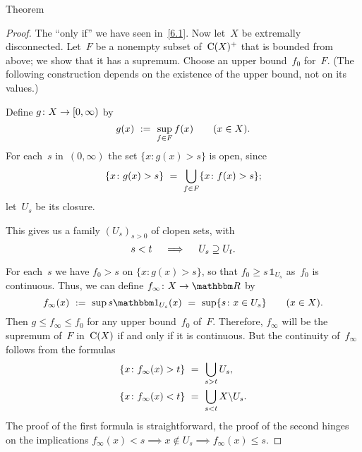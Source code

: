 \documentclass[main.tex]{subfiles}
\begin{document}
%
%
\begin{psec}{6.5}{Theorem}\end{psec}
\begin{proof}
The ``only if'' we have seen in~\ref{6.1}.
Now let~$X$ be extremally disconnected.
Let~$F$ be a nonempty subset of~$\mathrm{C}(X)^+$
that is bounded from above;
we show that it has a supremum.
Choose an upper bound~$f_0$ for~$F$.
(The following construction depends on the existence
of the upper bound, not on its values.)

Define $g\colon X\rightarrow [0,\infty)$ by
\begin{equation*}
g(x)\ :=\ \sup_{f\in F} f(x)\qquad(x\in X)\text{.}
\end{equation*}
For each~$s$ in~$(0,\infty)$
the set $\{x\colon g(x)>s\}$ is open, since
\begin{equation*}
\{x\colon g(x)>s\}\ =\ \bigcup_{f\in F} \{x\colon f(x)>s\}\htam{;}
\end{equation*}
let~$U_s$ be its closure.

This gives us a family $(U_s)_{s>0}$ of clopen sets, with
\begin{equation*}
s<t\quad\implies\quad U_s \supseteq U_t\text{.}
\end{equation*}

For each~$s$ we have $f_0 > s$ on $\{x\colon g(x)>s\}$,
so that $f_0\geq s\,\mathbb{1}_{U_s}$
as~$f_0$ is continuous.
Thus, we can define $f_\infty\colon X\ra \R$ by
\begin{equation*}
f_\infty(x)\ 
:=\ \sup s\mathbb{1}_{U_s}(x)\ 
=\ \sup\{s\colon x\in U_s\}
\qquad(x\in X)\htam{.}
\end{equation*}
Then $g\leq f_\infty\leq f_0$ for any upper bound~$f_0$ of~$F$.
Therefore, $f_\infty$ will be the supremum of~$F$ in~$\mathrm{C}(X)$
if and only if it is continuous.
But the continuity of~$f_\infty$ follows from the formulas
\begin{align*}
\{ x\colon f_\infty(x)>t\}\ &=\ \bigcup_{s>t} U_s\text{,}\\
\{ x\colon f_\infty(x)<t\}\ &=\ \bigcup_{s<t} X\backslash U_s\text{.}
\end{align*}
The proof of the first formula is straightforward,
the proof of the second hinges on the implications
$f_\infty(x)<s\implies x\notin U_s \implies f_\infty(x)\leq s$. \xqed
\end{proof}
%
%
\end{document}
